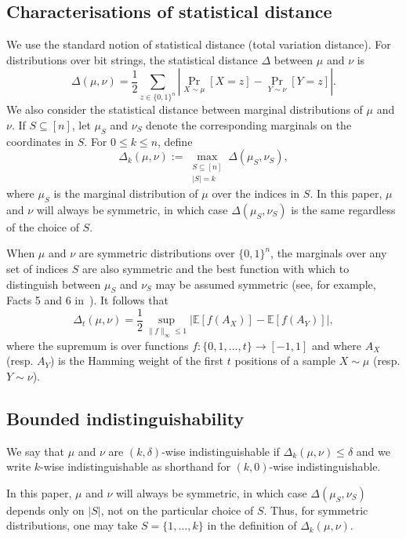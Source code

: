 \documentclass[manuscript,nonacm]{acmart}
\begin{document}
\subsection{Characterisations of statistical distance}
We use the standard notion of statistical distance (total variation distance). For distributions over bit strings, the statistical distance $\Delta$ between $\mu$ and $\nu$ is
\[
\Delta(\mu,\nu)=\frac{1}{2}\sum_{z \in \{0,1\}^n}
\left|
\Pr_{X \sim \mu}[X = z] - \Pr_{Y \sim \nu}[Y = z]
\right|.
\]
We also consider the statistical distance between marginal distributions of $\mu$ and $\nu$. If $S \subseteq [n]$, let $\mu_S$ and
$\nu_S$ denote the corresponding marginals on the coordinates in $S$. For
$0 \leq k \leq n$, define
\[
\Delta_k(\mu,\nu)
:=
\max_{\substack{S \subseteq [n] \\ |S|=k}}
\Delta(\mu_S,\nu_S),
\]
where $\mu_S$ is the marginal distribution of $\mu$ over the indices in $S$. In this paper, $\mu$ and $\nu$ will always be symmetric, in which case $\Delta(\mu_S,\nu_S)$ is the same regardless of the choice of $S$.

When $\mu$ and $\nu$ are symmetric distributions over $\{0,1\}^n$, the marginals over any set of indices $S$ are also symmetric and the best function with which to distinguish between $\mu_S$ and $\nu_S$ may be assumed symmetric (see, for example, Facts 5 and 6 in~\cite{williamson2021sharp}). It follows that 
\begin{equation}
    \label{eq:stat_dis}
    \Delta_t(\mu,\nu)
=
\frac12
\sup_{\|f\|_\infty\le 1}
\left|
    \mathbb E[f(A_X)]-\mathbb E[f(A_Y)]
\right|,
\end{equation}
where the supremum is over functions $f:\{0,1,\dots,t\}\to[-1,1]$ and where $A_X$ (resp. $A_Y$) is the Hamming weight of the first $t$ positions of a sample $X\sim\mu$ (resp. $Y\sim\nu$).

 



\subsection{Bounded indistinguishability}
We say that \(\mu\) and \(\nu\) are \((k,\delta)\)-wise
indistinguishable if $\Delta_k(\mu,\nu)\le \delta$ and we write \(k\)-wise indistinguishable as shorthand for
\((k,0)\)-wise indistinguishable.

In this paper, \(\mu\) and \(\nu\) will always be symmetric, in which
case \(\Delta(\mu_S,\nu_S)\) depends only on \(|S|\), not on the
particular choice of \(S\). Thus, for symmetric distributions, one may
take \(S=\{1,\dots,k\}\) in the definition of \(\Delta_k(\mu,\nu)\).
\end{document}
